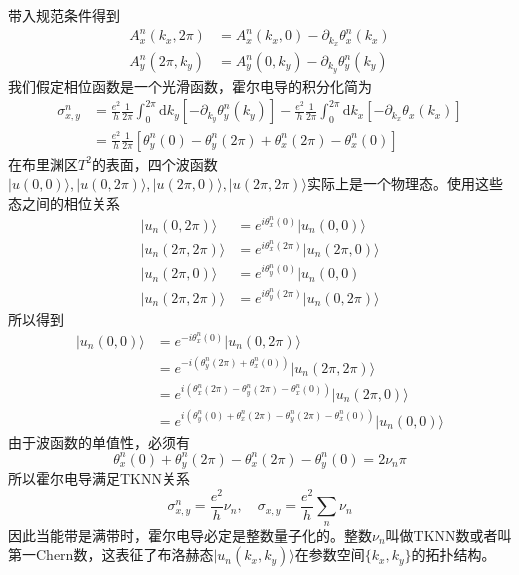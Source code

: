 \documentclass{article}
\numberwithin{equation}{subsection}
\begin{document}
带入规范条件得到
\begin{equation}
    \begin{split}
        A_x^n(k_x,2\pi)&=A_x^n(k_x,0)-\partial_{k_x}\theta_x^n(k_x)\\
        A_y^n(2\pi,k_y)&=A_y^n(0,k_y)-\partial_{k_y}\theta_y^n(k_y)
    \end{split}
\end{equation}
我们假定相位函数是一个光滑函数，霍尔电导的积分化简为
\begin{equation}
    \begin{split}
        \sigma_{x,y}^n&=\frac{e^2}{h}\frac{1}{2\pi}\int_0^{2\pi}\mathrm{d}k_y[-\partial_{k_y}\theta_y^n(k_y)]-\frac{e^2}{h}\frac{1}{2\pi}\int_0^{2\pi}\mathrm{d}k_x[-\partial_{k_x}\theta_x(k_x)]\\
        &=\frac{e^2}{h}\frac{1}{2\pi}[\theta_y^n(0)-\theta_y^n(2\pi)+\theta_x^n(2\pi)-\theta_x^n(0)]
    \end{split}
\end{equation}
在布里渊区$T^2$的表面，四个波函数$|u(0,0)\rangle,|u(0,2\pi)\rangle,|u(2\pi,0)\rangle,|u(2\pi,2\pi)\rangle$实际上是一个物理态。使用这些态之间的相位关系
\begin{equation}
    \begin{split}
        |u_n(0,2\pi)\rangle&=e^{i\theta_x^n(0)}|u_n(0,0)\rangle\\
        |u_n(2\pi,2\pi)\rangle&=e^{i\theta_x^n(2\pi)}|u_n(2\pi,0)\rangle\\
        |u_n(2\pi,0)\rangle&=e^{i\theta_y^n(0)}|u_n(0,0)\\
        |u_n(2\pi,2\pi)\rangle&=e^{i\theta_y^n(2\pi)}|u_n(0,2\pi)\rangle
    \end{split}
\end{equation}
所以得到
\begin{equation}
    \begin{split}
        |u_n(0,0)\rangle&=e^{-i\theta_x^n(0)}|u_n(0,2\pi)\rangle\\
        &=e^{-i(\theta_y^n(2\pi)+\theta_x^n(0))}|u_n(2\pi,2\pi)\rangle\\
        &=e^{i(\theta_x^n(2\pi)-\theta_y^n(2\pi)-\theta_x^n(0))}|u_n(2\pi,0)\rangle\\
        &=e^{i(\theta_y^n(0)+\theta_x^n(2\pi)-\theta_y^n(2\pi)-\theta_x^n(0))}|u_n(0,0)\rangle
    \end{split}
\end{equation}
由于波函数的单值性，必须有
\begin{equation}
    \theta_{x}^n(0)+\theta_{y}^n(2 \pi)-\theta_{x}^n(2 \pi)-\theta_{y}^n(0)=2 \nu_n \pi
\end{equation}
所以霍尔电导满足TKNN关系
\begin{equation}
    \sigma_{x,y}^n=\frac{e^2}{h}\nu_n,\quad\sigma_{x,y}=\frac{e^2}{h}\sum_n\nu_n
\end{equation}
因此当能带是满带时，霍尔电导必定是整数量子化的。整数$\nu_n$叫做TKNN数或者叫第一Chern数，这表征了布洛赫态$|u_n(k_x,k_y)\rangle$在参数空间$\{k_x,k_y\}$的拓扑结构。
\end{document}
